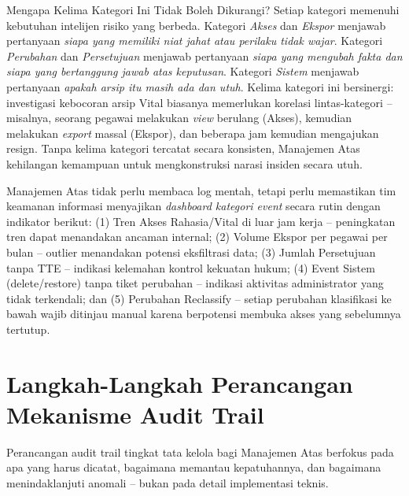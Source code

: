 \documentclass[12pt,a4paper]{report}
\begin{document}
\noindent Mengapa Kelima Kategori Ini Tidak Boleh Dikurangi? Setiap kategori memenuhi kebutuhan intelijen risiko yang berbeda. Kategori \textit{Akses} dan \textit{Ekspor} menjawab pertanyaan \textit{siapa yang memiliki niat jahat atau perilaku tidak wajar}. Kategori \textit{Perubahan} dan \textit{Persetujuan} menjawab pertanyaan \textit{siapa yang mengubah fakta dan siapa yang bertanggung jawab atas keputusan}. Kategori \textit{Sistem} menjawab pertanyaan \textit{apakah arsip itu masih ada dan utuh}. Kelima kategori ini bersinergi: investigasi kebocoran arsip Vital biasanya memerlukan korelasi lintas-kategori -- misalnya, seorang pegawai melakukan \textit{view} berulang (Akses), kemudian melakukan \textit{export} massal (Ekspor), dan beberapa jam kemudian mengajukan resign. Tanpa kelima kategori tercatat secara konsisten, Manajemen Atas kehilangan kemampuan untuk mengkonstruksi narasi insiden secara utuh.

\begin{plnbox}
Manajemen Atas tidak perlu membaca log mentah, tetapi perlu memastikan tim keamanan informasi menyajikan \textit{dashboard kategori event} secara rutin dengan indikator berikut: (1) Tren Akses Rahasia/Vital di luar jam kerja -- peningkatan tren dapat menandakan ancaman internal; (2) Volume Ekspor per pegawai per bulan -- outlier menandakan potensi eksfiltrasi data; (3) Jumlah Persetujuan tanpa TTE -- indikasi kelemahan kontrol kekuatan hukum; (4) Event Sistem (delete/restore) tanpa tiket perubahan -- indikasi aktivitas administrator yang tidak terkendali; dan (5) Perubahan Reclassify -- setiap perubahan klasifikasi ke bawah wajib ditinjau manual karena berpotensi membuka akses yang sebelumnya tertutup.
\end{plnbox}


\section{Langkah-Langkah Perancangan Mekanisme Audit Trail}
Perancangan audit trail tingkat tata kelola bagi Manajemen Atas berfokus pada apa yang harus dicatat, bagaimana memantau kepatuhannya, dan bagaimana menindaklanjuti anomali -- bukan pada detail implementasi teknis.
\end{document}
